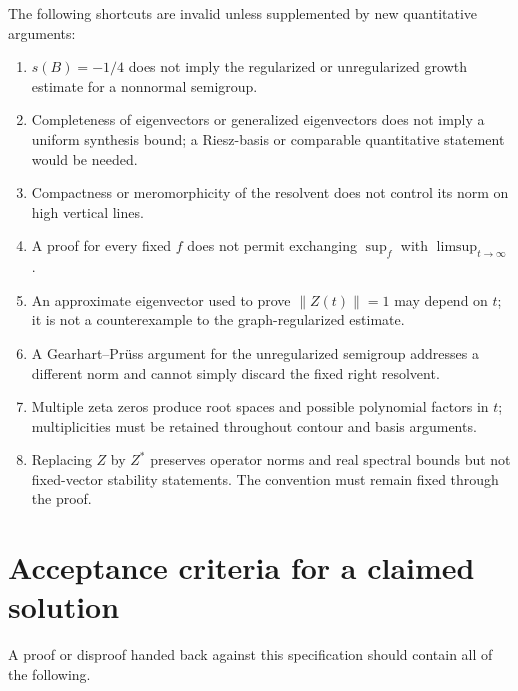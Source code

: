 \documentclass[11pt]{amsart}
\theoremstyle{definition}
\theoremstyle{remark}
\newcommand{\norm}[1]{\left\lVert #1\right\rVert}
\begin{document}
The following shortcuts are invalid unless supplemented by new quantitative
arguments:
\begin{enumerate}[label=(S\arabic*)]
 \item $s(B)=-1/4$ does not imply the regularized or unregularized growth
       estimate for a nonnormal semigroup.
 \item Completeness of eigenvectors or generalized eigenvectors does not imply
       a uniform synthesis bound; a Riesz-basis or comparable quantitative
       statement would be needed.
 \item Compactness or meromorphicity of the resolvent does not control its norm
       on high vertical lines.
 \item A proof for every fixed $f$ does not permit exchanging
       $\sup_{f}$ with $\limsup_{t\to\infty}$.
 \item An approximate eigenvector used to prove $\norm{Z(t)}=1$ may depend on
       $t$; it is not a counterexample to the graph-regularized estimate.
 \item A Gearhart--Pr\"uss argument for the unregularized semigroup addresses a
       different norm and cannot simply discard the fixed right resolvent.
 \item Multiple zeta zeros produce root spaces and possible polynomial factors
       in $t$; multiplicities must be retained throughout contour and basis
       arguments.
 \item Replacing $Z$ by $Z^{*}$ preserves operator norms and real spectral
       bounds but not fixed-vector stability statements.  The convention must
       remain fixed through the proof.
\end{enumerate}

\section{Acceptance criteria for a claimed solution}

A proof or disproof handed back against this specification should contain all
of the following.
\end{document}
